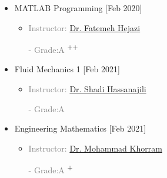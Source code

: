 \documentclass[10pt,a4paper,sans]{moderncv} %
\begin{document}
	\begin{multicols}{2}
		\begin{itemize}
			\item {} MATLAB Programming \hfill[Feb 2020]
			\begin{itemize}
				\item \textcolor{gray}{Instructor: \href{https://scholar.google.com/citations?hl=en&user=SJs5rMcAAAAJ}{Dr. Fatemeh Hejazi
}}

        \begin{itemize}
               
        \textcolor{gray}{ - Grade:A  }\textsuperscript{++}
        \end{itemize}
			\end{itemize}
			
			\item {} Fluid Mechanics 1 \hfill[Feb 2021]
			\begin{itemize}
				\item \textcolor{gray}{Instructor: \href{https://scholar.google.com/citations?hl=en&user=h1wVb0IAAAAJ&view_op=list_works&sortby=pubdate}{Dr. Shadi Hassanajili
}}
			 \begin{itemize}
                \textcolor{gray}{- Grade:A}\textsuperscript{}
                 
                 \end{itemize}   
  
			\end{itemize}
			
			\item {} Engineering Mathematics \hfill[Feb 2021]
			\begin{itemize}
				\item \textcolor{gray}{Instructor: \href{https://scholar.google.com/citations?user=swfaYtQAAAAJ&hl=en}{Dr. Mohammad Khorram
}
}			
               \vspace{-0.1 em} 
               \begin{itemize}
               
                
                \textcolor{gray}{- Grade:A }\textsuperscript{+}
                

\end{itemize}
\end{itemize}
\end{itemize}
\end{multicols}
\end{document}
